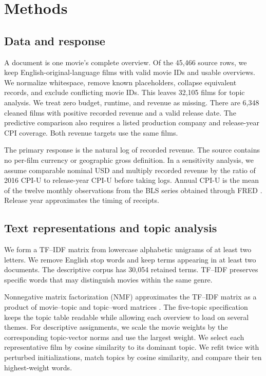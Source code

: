 \section{Methods}

\subsection{Data and response}

A document is one movie's complete overview. Of the 45,466 source rows, we keep
English-original-language films with valid movie IDs and usable overviews.
We normalize whitespace, remove known placeholders, collapse equivalent
records, and exclude conflicting movie IDs. This leaves 32,105 films for topic
analysis. We treat zero budget, runtime, and revenue as missing. There are
6,348 cleaned films with positive recorded revenue and a valid release date.
The predictive comparison also requires a listed production company and
release-year CPI coverage. Both revenue targets use the same films.

The primary response is the natural log of recorded revenue. The source
contains no per-film currency or geographic gross definition. In a sensitivity
analysis, we assume comparable nominal USD and multiply recorded revenue by the
ratio of 2016 CPI-U to release-year CPI-U before taking logs. Annual CPI-U is
the mean of the twelve monthly observations from the BLS series obtained
through FRED \cite{cpi}. Release year approximates the timing of receipts.

\subsection{Text representations and topic analysis}

We form a TF--IDF matrix from lowercase alphabetic unigrams of at least two
letters. We remove English stop words and keep terms appearing in at least two
documents. The descriptive corpus has 30,054 retained terms. TF--IDF preserves
specific words that may distinguish movies within the same genre.

Nonnegative matrix factorization (NMF) approximates the TF--IDF matrix as a
product of movie--topic and topic--word matrices \cite{lee1999}. The five-topic
specification keeps the topic table readable while allowing each overview to
load on several themes. For descriptive assignments, we scale the movie
weights by the corresponding topic-vector norms and use the largest weight.
We select each representative film by cosine similarity to its dominant
topic. We refit twice with perturbed initializations, match topics by cosine
similarity, and compare their ten highest-weight words.


